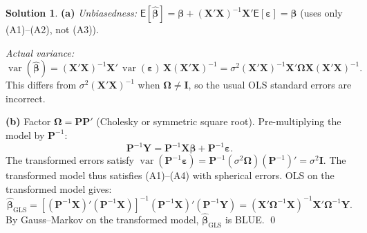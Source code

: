 \documentclass[12pt,a4paper]{article}
\theoremstyle{definition}
\newtheorem*{solution*}{Solution}
\newcommand\expc{\mathsf{E}}
\DeclareMathOperator\var{var}
\newcommand{\bX}{\mathbf{X}}
\newcommand{\bY}{\mathbf{Y}}
\def\bb{\boldsymbol{\beta}}
\newcommand{\be}{\boldsymbol{\varepsilon}}
\newcommand{\bI}{\mathbf{I}}
\newcommand{\bP}{\mathbf{P}}
\begin{document}
\begin{solution*}
\textbf{(a)} \emph{Unbiasedness:} $\expc[\hat{\bb}] = \bb + (\bX'\bX)^{-1}\bX'\expc[\be] = \bb$ (uses only (A1)--(A2), not (A3)).

\emph{Actual variance:}
\[
\var(\hat{\bb}) = (\bX'\bX)^{-1}\bX'\,\var(\be)\,\bX(\bX'\bX)^{-1} = \sigma^2(\bX'\bX)^{-1}\bX'\boldsymbol\Omega\bX(\bX'\bX)^{-1}.
\]
This differs from $\sigma^2(\bX'\bX)^{-1}$ when $\boldsymbol\Omega \neq \bI$, so the usual OLS standard errors are incorrect.

\textbf{(b)} Factor $\boldsymbol\Omega = \bP\bP'$ (Cholesky or symmetric square root). Pre-multiplying the model by $\bP^{-1}$:
\[
\bP^{-1}\bY = \bP^{-1}\bX\bb + \bP^{-1}\be.
\]
The transformed errors satisfy $\var(\bP^{-1}\be) = \bP^{-1}(\sigma^2\boldsymbol\Omega)(\bP^{-1})' = \sigma^2\bI$. The transformed model thus satisfies (A1)--(A4) with spherical errors. OLS on the transformed model gives:
\[
\hat{\bb}_{\mathrm{GLS}} = [(\bP^{-1}\bX)'(\bP^{-1}\bX)]^{-1}(\bP^{-1}\bX)'(\bP^{-1}\bY) = (\bX'\boldsymbol\Omega^{-1}\bX)^{-1}\bX'\boldsymbol\Omega^{-1}\bY.
\]
By Gauss--Markov on the transformed model, $\hat{\bb}_{\mathrm{GLS}}$ is BLUE. \qed
\end{solution*}
\end{document}
